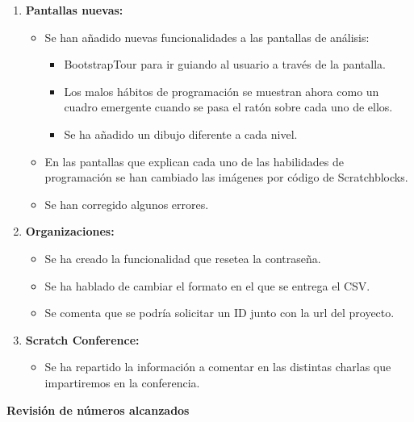 \documentclass[a4paper,12pt]{letter}
\begin{document}
\begin{letter}
\begin{enumerate}
    
    \item{\textbf {Pantallas nuevas:}}
    \begin{itemize}
            \item {Se han añadido nuevas funcionalidades a las pantallas de análisis:}
                \begin{itemize}
                    \item {BootstrapTour para ir guiando al usuario a través de la pantalla.}
                     \item {Los malos hábitos de programación se muestran ahora como un cuadro emergente cuando se pasa el ratón sobre cada uno de ellos.}
                     \item {Se ha añadido un dibujo diferente a cada nivel.}
                 \end{itemize}
            \item {En las pantallas que explican cada uno de las habilidades de programación se han cambiado las imágenes por código de Scratchblocks.}
            \item {Se han corregido algunos errores.}
    \end{itemize}
    
    \item{\textbf {Organizaciones:}}
    \begin{itemize}
            \item {Se ha creado la funcionalidad que resetea la contraseña.}
            \item {Se ha hablado de cambiar el formato en el que se entrega el CSV.}
            \item {Se comenta que se podría solicitar un ID junto con la url del proyecto.}
    \end{itemize}

    \item{\textbf {Scratch Conference:}}
    \begin{itemize}
        \item {Se ha repartido la información a comentar en las distintas charlas que impartiremos en la conferencia.}
    \end{itemize}

\end{enumerate}

\vspace{2cm}
\textbf{{\LARGE Revisión de números alcanzados}}
\vspace{0.5cm}


\end{letter}
\end{document}
